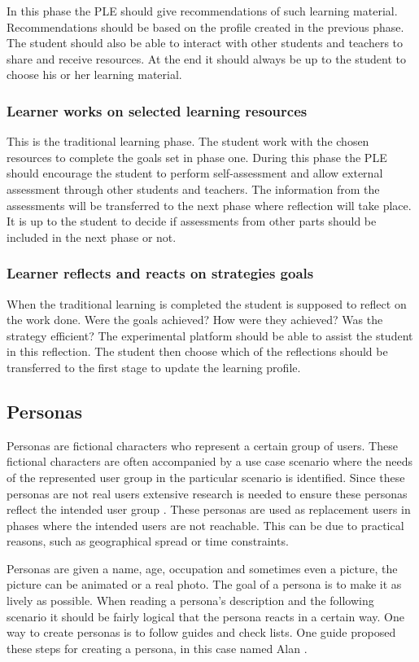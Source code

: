 In this phase the PLE should give recommendations of such learning material. Recommendations should be based on the profile created in the previous phase. The student should also be able to interact with other students and teachers to share and receive resources. At the end it should always be up to the student to choose his or her learning material.

\subsubsection {Learner works on selected learning resources}
This is the traditional learning phase. The student work with the chosen resources to complete the goals set in phase one. During this phase the PLE should encourage the student to perform self-assessment and allow external assessment through other students and teachers. The information from the assessments will be transferred to the next phase where reflection will take place. It is up to the student to decide if assessments from other parts should be included in the next phase or not.

\subsubsection {Learner reflects and reacts on strategies goals}
When the traditional learning is completed the student is supposed to reflect on the work done. Were the goals achieved? How were they achieved? Was the strategy efficient?
The experimental platform should be able to assist the student in this reflection. The student then choose which of the reflections should be transferred to the first stage to update the learning profile.

\subsection {Personas}
Personas are fictional characters who represent a certain group of users. These fictional characters are often accompanied by a use case scenario where the needs of the represented user group in the particular scenario is identified. Since these personas are not real users extensive research is needed to ensure these personas reflect the intended user group \cite{gudjonsdottir}. These personas are used as replacement users in phases where the intended users are not reachable. This can be due to practical reasons, such as geographical spread or time constraints.

Personas are given a name, age, occupation and sometimes even a picture, the picture can be animated or a real photo. The goal of a persona is to make it as lively as possible. When reading a persona's description and the following scenario it should be fairly logical that the persona reacts in a certain way. One way to create personas is to follow guides and check lists. One guide proposed these steps for creating a persona, in this case named Alan \cite{pruitt}.

